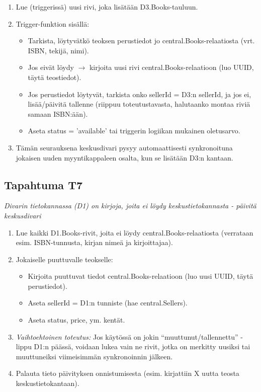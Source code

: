 \documentclass[11pt,a4paper]{article}
\begin{document}
\begin{enumerate}
	\item Lue (triggerissä) uusi rivi, joka lisätään D3.Books-tauluun.
	\item Trigger-funktion sisällä:
	      \begin{itemize}
		      \item Tarkista, löytyvätkö teoksen perustiedot jo central.Books-relaatiosta (vrt. ISBN, tekijä, nimi).
		      \item Jos eivät löydy $\to$ kirjoita uusi rivi central.Books-relaatioon (luo UUID, täytä teostiedot).
		      \item Jos perustiedot löytyvät, tarkista onko sellerId = D3:n sellerId, ja jos ei, lisää/päivitä tallenne (riippuu toteutustavasta, halutaanko montaa riviä samaan ISBN:ään).
		      \item Aseta status = 'available' tai triggerin logiikan mukainen oletusarvo.
	      \end{itemize}
	\item Tämän seurauksena keskusdivari pysyy automaattisesti synkronoituna jokaisen uuden myyntikappaleen osalta, kun se lisätään D3:n kantaan.
\end{enumerate}

\subsection{Tapahtuma T7}
{\large{\textit{Divarin tietokannassa (D1) on kirjoja, joita ei löydy keskustietokannasta - päivitä keskusdivari}}}

\begin{enumerate}
	\item Lue kaikki D1.Books-rivit, joita ei löydy central.Books-relaatiosta (verrataan esim. ISBN-tunnusta, kirjan nimeä ja kirjoittajaa).
	\item Jokaiselle puuttuvalle teokselle:
	      \begin{itemize}
		      \item Kirjoita puuttuvat tiedot central.Books-relaatioon (luo uusi UUID, täytä perustiedot).
		      \item Aseta sellerId = D1:n tunniste (hae central.Sellers).
		      \item Aseta status, price, ym. kentät.
	      \end{itemize}
	\item \textit{Vaihtoehtoinen toteutus:} Jos käytössä on jokin “muuttunut/tallennettu” -lippu D1:n päässä, voidaan lukea vain ne rivit, jotka on merkitty uusiksi tai muuttuneiksi viimeisimmän synkronoinnin jälkeen.
	\item Palauta tieto päivityksen onnistumisesta (esim. kirjattiin X uutta teosta keskustietokantaan).
\end{enumerate}
\end{document}
